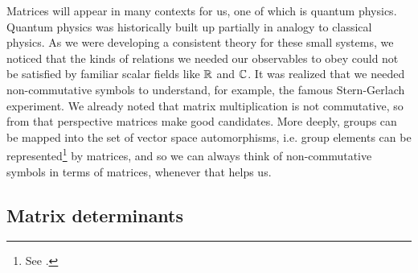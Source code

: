 Matrices will appear in many contexts for us, one of which
is quantum physics. Quantum physics was historically built up partially in
analogy to classical physics. As we were developing a consistent theory for these
small systems, we noticed that the kinds of relations we needed our observables
to obey could not be satisfied by familiar scalar fields like $\mathbb{R}$ and $\mathbb{C}$.
It was realized that we needed non-commutative symbols to understand,
for example, the famous Stern-Gerlach experiment. We already noted that matrix
multiplication is not commutative, so from that perspective matrices make good
candidates. More deeply, groups can be mapped into the set of
vector space automorphisms,
i.e. group elements can be 
represented\footnote{See .} by matrices,
and so we can always think of non-commutative symbols in terms of matrices,
whenever that helps us.

\subsection{Matrix determinants}\label{sec:determinants}

